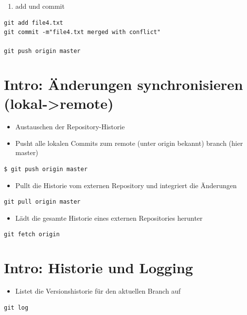 \documentclass[11pt]{article}
\begin{document}
\begin{enumerate}
\item add und commit
\end{enumerate}
\begin{verbatim}
git add file4.txt
git commit -m"file4.txt merged with conflict"

git push origin master
\end{verbatim}


\section{Intro: Änderungen synchronisieren (lokal->remote)}
\label{sec:org8a7f96f}

\begin{itemize}
\item Austauschen der Repository-Historie

\item Pusht alle lokalen Commits zum remote (unter origin bekannt) branch (hier master)
\end{itemize}
\begin{verbatim}
$ git push origin master
\end{verbatim}


\begin{itemize}
\item Pullt die Historie vom externen Repository und integriert die Änderungen
\end{itemize}
\begin{verbatim}
git pull origin master
\end{verbatim}


\begin{itemize}
\item Lädt die gesamte Historie eines externen Repositories herunter
\end{itemize}
\begin{verbatim}
git fetch origin
\end{verbatim}




\section{Intro: Historie und Logging}
\label{sec:orgb166d71}

\begin{itemize}
\item Listet die Versionshistorie für den aktuellen Branch auf
\end{itemize}
\begin{verbatim}
git log
\end{verbatim}
\end{document}
